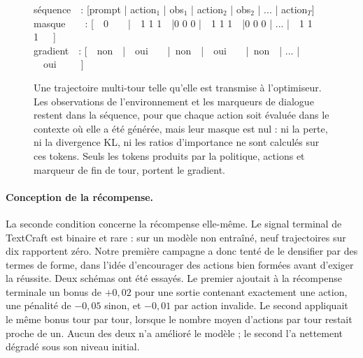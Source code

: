 \documentclass[11pt,a4paper]{article}
\begin{document}
\begin{figure}[htbp]
\centering
\begin{tcolorbox}[colback=gray!4, colframe=black!65, width=0.96\textwidth,
    title=\textbf{Séquence d'entraînement d'un épisode et masque des observations},
    fonttitle=\small, boxrule=0.6pt, arc=2mm, left=3mm, right=3mm, top=2mm, bottom=2mm]
{\small\ttfamily
séquence\ \ : [prompt | action$_1$ | obs$_1$ | action$_2$ | obs$_2$ | ... | action$_T$]\\
masque\ \ \ \ : [\ \ 0\ \ \ \ |\ \ 1 1 1\ \  |0 0 0 |\ \ 1 1 1\ \ |0 0 0 | ... |\ \ 1 1 1\ \ \ ]\\
gradient\  \ : [\ \ non\ \ |\ \ oui\ \ \ \  |\ non\ \ |\ \ oui\ \  \ \ |\ non\ \ | ... |\ \ oui\ \ \ \ \ ]
}
\end{tcolorbox}
\caption{Une trajectoire multi-tour telle qu'elle est transmise à l'optimiseur. Les observations de l'environnement et les marqueurs de dialogue restent dans la séquence, pour que chaque action soit évaluée dans le contexte où elle a été générée, mais leur masque est nul : ni la perte, ni la divergence KL, ni les ratios d'importance ne sont calculés sur ces tokens. Seuls les tokens produits par la politique, actions et marqueur de fin de tour, portent le gradient.}
\label{fig:env_mask}
\end{figure}





\paragraph{Conception de la récompense.} La seconde condition concerne la récompense elle-même. Le signal terminal de TextCraft est binaire et rare : sur un modèle non entraîné, neuf trajectoires sur dix rapportent zéro. Notre première campagne a donc tenté de le densifier par des termes de forme, dans l'idée d'encourager des actions bien formées avant d'exiger la réussite. Deux schémas ont été essayés. Le premier ajoutait à la récompense terminale un bonus de $+0{,}02$ pour une sortie contenant exactement une action, une pénalité de $-0{,}05$ sinon, et $-0{,}01$ par action invalide. Le second appliquait le même bonus tour par tour, lorsque le nombre moyen d'actions par tour restait proche de un. Aucun des deux n'a amélioré le modèle ; le second l'a nettement dégradé sous son niveau initial.
\end{document}
